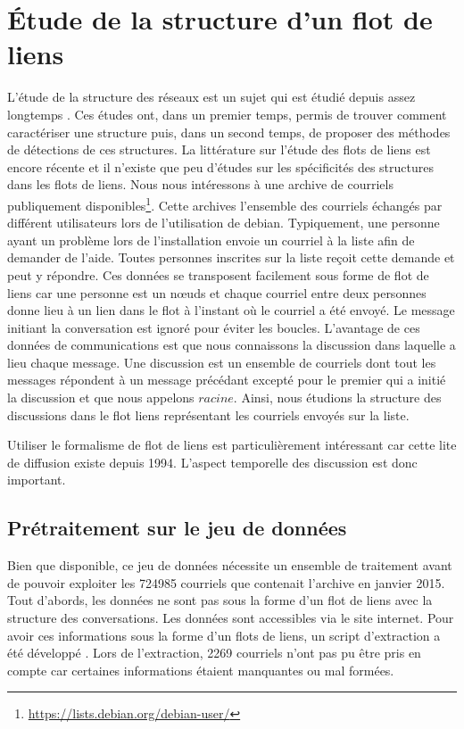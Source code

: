 

\chapter{Étude de la structure d'un flot de liens}

L'étude de la structure des réseaux est un sujet qui est étudié depuis assez longtemps \REF.
Ces études ont, dans un premier temps, permis de trouver comment caractériser une structure puis, dans un second temps, de proposer des méthodes de détections de ces structures.
La littérature sur l'étude des flots de liens est encore récente et il n'existe que peu d'études \REF sur les spécificités des structures dans les flots de liens.
Nous nous intéressons à une archive de courriels publiquement disponibles\footnote{\url{https://lists.debian.org/debian-user/}}.
Cette archives l'ensemble des courriels échangés par différent utilisateurs lors de l'utilisation de debian.
Typiquement, une personne ayant un problème lors de l'installation envoie un courriel à la liste afin de demander de l'aide.
Toutes personnes inscrites sur la liste reçoit cette demande et peut y répondre.
Ces données se transposent facilement sous forme de flot de liens car une personne est un n\oe uds et chaque courriel entre deux personnes donne lieu à un lien dans le flot à l'instant où le courriel a été envoyé.
Le message initiant la conversation est ignoré pour éviter les boucles.
L'avantage de ces données de communications est que nous connaissons la discussion dans laquelle a lieu chaque message.
Une discussion est un ensemble de courriels dont tout les messages répondent à un message précédant excepté pour le premier qui a initié la discussion et que nous appelons $racine$.
Ainsi, nous étudions la structure des discussions dans le flot liens représentant les courriels envoyés sur la liste.

Utiliser le formalisme de flot de liens est particulièrement intéressant car cette lite de diffusion existe depuis 1994.
L'aspect temporelle des discussion est donc important.



\section{Prétraitement sur le jeu de données}
Bien que disponible, ce jeu de données nécessite un ensemble de traitement avant de pouvoir exploiter les 724985 courriels que contenait l'archive en janvier 2015.
Tout d'abords, les données ne sont pas sous la forme d'un flot de liens avec la structure des conversations.
Les données sont accessibles via le site internet.
Pour avoir ces informations sous la forme d'un flots de liens, un script d'extraction a été développé .
Lors de l'extraction, 2269 courriels n'ont pas pu être pris en compte car certaines informations étaient manquantes ou mal formées.

